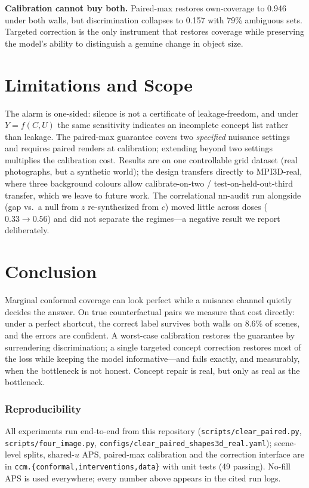 \documentclass[11pt]{article}
\begin{document}
\textbf{Calibration cannot buy both.} Paired-max restores own-coverage to 0.946
under both walls, but discrimination collapses to 0.157 with 79\% ambiguous
sets. Targeted correction is the only instrument that restores coverage while
preserving the model's ability to distinguish a genuine change in object size.

\section{Limitations and Scope}
\label{sec:limits}

The alarm is one-sided: silence is not a certificate of leakage-freedom, and
under $Y=f(C,U)$ the same sensitivity indicates an incomplete concept list
rather than leakage. The paired-max guarantee covers two \emph{specified}
nuisance settings and requires paired renders at calibration; extending beyond
two settings multiplies the calibration cost. Results are on one controllable
grid dataset (real photographs, but a synthetic world); the design transfers
directly to MPI3D-real, where three background colours allow calibrate-on-two /
test-on-held-out-third transfer, which we leave to future work. The
correlational nn-audit run alongside (gap vs.\ a null from $z$
re-synthesized from $c$) moved little across doses ($0.33\to0.56$) and did not
separate the regimes---a negative result we report deliberately.

\section{Conclusion}

Marginal conformal coverage can look perfect while a nuisance channel quietly
decides the answer. On true counterfactual pairs we measure that cost
directly: under a perfect shortcut, the correct label survives both walls on
8.6\% of scenes, and the errors are confident. A worst-case calibration
restores the guarantee by surrendering discrimination; a single targeted
concept correction restores most of the loss while keeping the model
informative---and fails exactly, and measurably, when the bottleneck is not
honest. Concept repair is real, but only as real as the bottleneck.

\subsubsection*{Reproducibility}
All experiments run end-to-end from this repository
(\texttt{scripts/clear\_paired.py}, \texttt{scripts/four\_image.py},
\texttt{configs/clear\_paired\_shapes3d\_real.yaml}); scene-level splits,
shared-$u$ APS, paired-max calibration and the correction interface are in
\texttt{ccm.\{conformal,interventions,data\}} with unit tests (49 passing).
No-fill APS is used everywhere; every number above appears in the cited run
logs.



\end{document}
